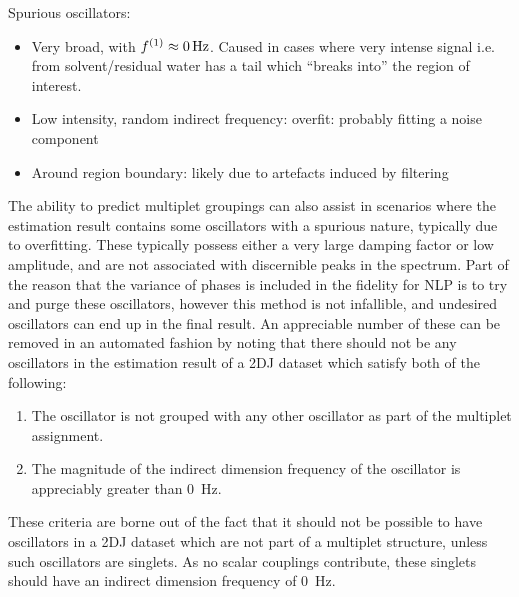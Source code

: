 Spurious oscillators:
\begin{itemize}
    \item Very broad, with $f^{(1)} \approx \qty{0}{\hertz}$. Caused in cases where very intense signal i.e. from solvent/residual water has a tail which ``breaks into'' the region of interest.
    \item Low intensity, random indirect frequency: overfit: probably fitting a
        noise component
    \item Around region boundary: likely due to artefacts induced by filtering
\end{itemize}
The ability to predict multiplet groupings can also assist in scenarios where
the estimation result contains some oscillators with a spurious nature,
typically due to overfitting. These typically possess either a very large
damping factor or low amplitude, and are not associated with discernible peaks
in the spectrum. Part of the reason that the variance of phases is included in
the fidelity for \ac{NLP} is to try and purge these oscillators, however this
method is not infallible, and undesired oscillators can end up in the final
result. An appreciable number of these can be removed in an automated fashion
by noting that there should not be any oscillators in the estimation result of
a 2DJ dataset which satisfy both of the following:
\begin{enumerate}
    \item The oscillator is not grouped with any other oscillator as part of
        the multiplet assignment.
    \item The magnitude of the indirect dimension frequency of the oscillator
        is appreciably greater than \qty{0}{\hertz}.
\end{enumerate}
These criteria are borne out of the fact that it should not be possible to have
oscillators in a 2DJ dataset which are not part of a multiplet structure,
unless such oscillators are singlets. As no scalar couplings contribute, these
singlets should have an indirect dimension frequency of \qty{0}{\hertz}.

